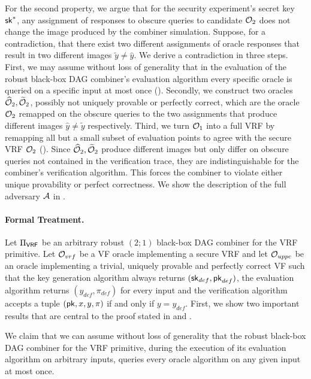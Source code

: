 For the second property, we argue that for the security experiment's secret key $\textup{\textsf{sk}}^*$,
any assignment of responses to obscure queries to candidate $\mathcal{O}_2$ does not change the image produced by the combiner simulation.
Suppose, for a contradiction, that there exist two different assignments of oracle responses that result in two different
images $\tilde y \neq \hat y$. We derive a contradiction in three steps. First, we may assume without loss of generality that 
in the evaluation of the robust black-box DAG combiner's evaluation algorithm every specific oracle is queried on a specific input 
at most once (). Secondly, we construct two oracles $\widehat{\mathcal{O}}_2, \widetilde{\mathcal{O}}_2$, possibly not uniquely provable or perfectly correct, which are 
the oracle $\mathcal{O}_2$ remapped on the obscure queries to the two assignments that produce different images $\hat y \neq \tilde y$ respectively.
Third, we turn $\mathcal{O}_1$ into a full VRF by remapping all but a small subset of evaluation points to agree with the secure VRF $\mathcal{O}_2$ ().
Since $\widehat{\mathcal{O}}_2, \widetilde{\mathcal{O}}_2$ produce different images but only differ on obscure queries not contained in the verification trace,
they are indistinguishable for the combiner's verification algorithm. This forces the combiner to violate either unique provability or perfect correctness.
We show the description of the full adversary $\mathcal{A}$ in .

\paragraph{Formal Treatment.}
Let $\BBComb{VRF}$ be an arbitrary robust $(2;1)$ black-box DAG combiner for the VRF primitive.
Let $\mathcal{O}_{vrf}$ be a VF oracle implementing a secure VRF and let $\mathcal{O}_{uppc}$ be an oracle implementing 
a trivial, uniquely provable and perfectly correct VF such that the key generation algorithm always returns 
$(\textup{\textsf{sk}}_{def}, \textup{\textsf{pk}}_{def})$, the evaluation algorithm returns $(y_{def}, \pi_{def})$ for every input and 
the verification algorithm accepts a tuple $(\textup{\textsf{pk}}, x, y, \pi)$ if and only if $y = y_{def}$.
First, we show two important results that are central to the proof stated in  and 
.

We claim that we can assume without loss of generality that the robust black-box DAG combiner
for the VRF primitive, during the execution of its evaluation algorithm on arbitrary inputs,
queries every oracle algorithm on any given input at most once.


